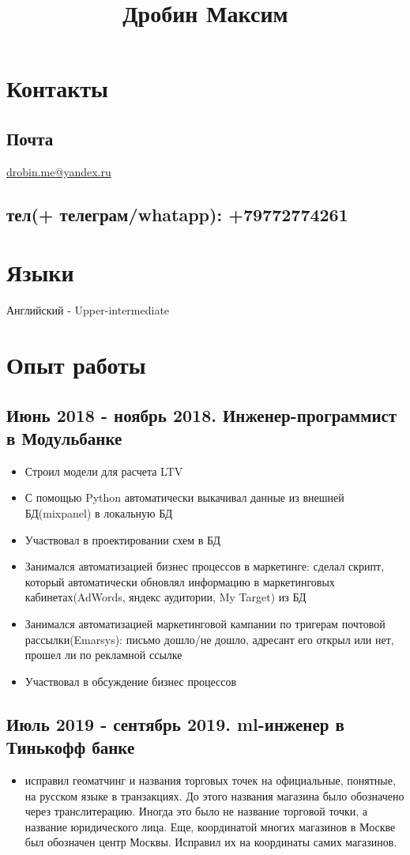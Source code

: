 \documentclass[11pt]{article}
\date{}
\title{Дробин Максим}
\begin{document}
\maketitle
\section{Контакты}
\label{sec:orgb140f8b}
\subsection{Почта}
\label{sec:org932ad7a}
\href{mailto:drobin.me@yandex.ru}{drobin.me@yandex.ru}

\subsection{тел(+ телеграм/whatapp): +79772774261}
\label{sec:orgdff1f87}
\section{Языки}
\label{sec:orgf4d4dbb}
Английский - Upper-intermediate
\section{Опыт работы}
\label{sec:orga6f9032}
\subsection{Июнь 2018 - ноябрь 2018. Инженер-программист в Модульбанке}
\label{sec:org0c71276}
\begin{itemize}
\item Строил модели для расчета LTV
\item С помощью Python автоматически выкачивал данные из внешней БД(mixpanel) в локальную БД
\item Участвовал в проектировании схем в БД
\item Занимался автоматизацией бизнес процессов в маркетинге: сделал скрипт, который автоматически обновлял информацию в маркетинговых кабинетах(AdWords, яндекс аудитории, My Target) из БД
\item Занимался автоматизацией маркетинговой кампании по тригерам почтовой рассылки(Emarsys): письмо дошло/не дошло, адресант его открыл или нет, прошел ли по рекламной ссылке
\item Участвовал в обсуждение бизнес процессов
\end{itemize}
\subsection{Июль 2019 - сентябрь 2019. ml-инженер в Тинькофф банке}
\label{sec:orgee591b2}
\begin{itemize}
\item исправил геоматчинг и названия торговых точек на официальные, понятные, на русском языке в транзакциях. До этого названия магазина было обозначено через транслитерацию. Иногда это было не название торговой точки, а название юридического лица. Еще, координатой многих магазинов в Москве был обозначен центр Москвы. Исправил их на координаты самих магазинов.
\end{itemize}
\end{document}
